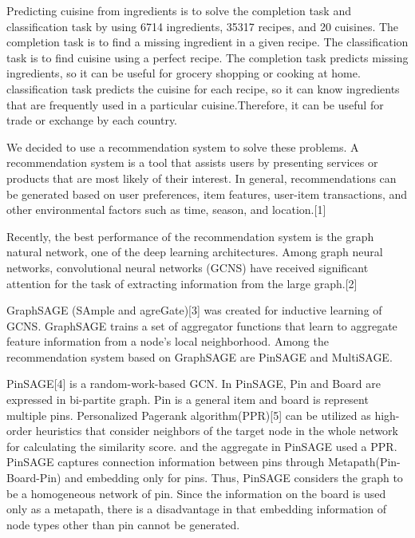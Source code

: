 
 Predicting cuisine from ingredients is to solve the completion task and classification task by using 6714
ingredients, 35317 recipes, and 20 cuisines. The completion task is to find a missing ingredient in a given recipe. The classification task is to find cuisine using a perfect recipe. The completion task predicts missing ingredients, so it can be useful for grocery shopping or cooking at home. classification task predicts the cuisine for each recipe, so it can know ingredients that are frequently used in a particular cuisine.Therefore, it can be useful for trade or exchange by each country.

We decided to use a recommendation system to solve these problems. A recommendation system is a tool that assists users by presenting services or products that are most likely of their interest. In general, recommendations can be generated based on user preferences, item features, user-item transactions, and other environmental factors such as time, season, and location.[1]

Recently, the best performance of the recommendation system is the graph natural network, one of the deep learning architectures. Among graph neural networks, convolutional neural networks (GCNS) have received significant attention for the task of extracting information from the large graph.[2] 

GraphSAGE (SAmple and agreGate)[3] was created for inductive learning of GCNS. GraphSAGE trains a set of aggregator functions that learn to aggregate feature information from a node’s local neighborhood. Among the recommendation system based on GraphSAGE are PinSAGE and  MultiSAGE.

PinSAGE[4] is a random-work-based GCN.  In PinSAGE, Pin and Board are expressed in bi-partite graph. Pin is a general item and board is represent multiple pins. Personalized Pagerank algorithm(PPR)[5] can be utilized as high-order heuristics that consider neighbors of the target node in the whole network for calculating the similarity score. and the aggregate in PinSAGE used a PPR. PinSAGE captures connection information between pins through Metapath(Pin-Board-Pin) and embedding only for pins. Thus, PinSAGE considers the graph to be a homogeneous network of pin.  Since the information on the board is used only as a metapath, there is a disadvantage in that embedding information of node types other than pin cannot be generated.

